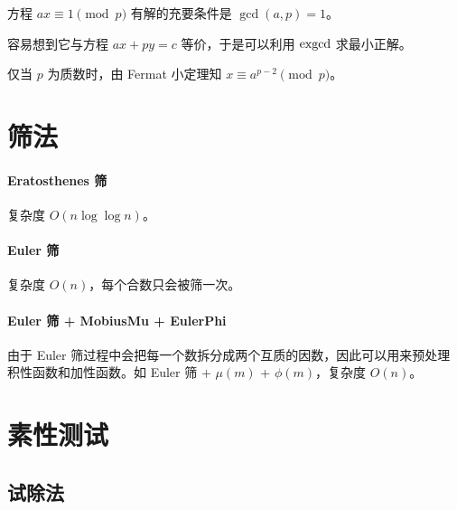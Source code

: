 \documentclass{probook}
\begin{document}
\begin{multicols}{2}
方程 $ax \equiv 1 \pmod p$ 有解的充要条件是 $\gcd(a,p) = 1$。

容易想到它与方程 $ax + py = c$ 等价，于是可以利用 $\rm exgcd$ 求最小正解。



仅当 $p$ 为质数时，由 Fermat 小定理知 $x \equiv a^{p-2} \pmod p$。



\section{筛法}

\paragraph{Eratosthenes 筛}

复杂度 $O(n\log \log n)$。



\paragraph{Euler 筛}

复杂度 $O(n)$，每个合数只会被筛一次。



\paragraph{Euler 筛 + MobiusMu + EulerPhi}

由于 Euler 筛过程中会把每一个数拆分成两个互质的因数，因此可以用来预处理积性函数和加性函数。如 Euler 筛 + $\mu(m)$ + $\phi(m)$，复杂度 $O(n)$。



\section{素性测试}

\subsection{试除法}


\end{multicols}
\end{document}
